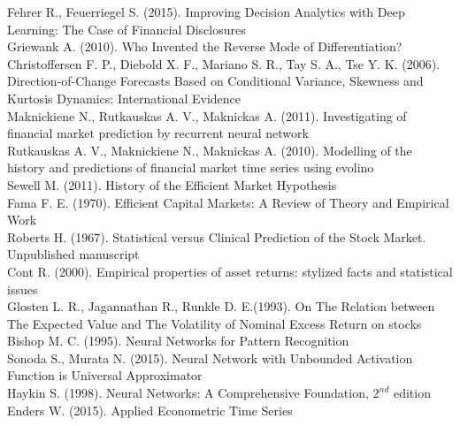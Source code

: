 \documentclass[12pt, letterpaper]{amsart}%
\begin{document}
Fehrer R., Feuerriegel S. (2015). Improving Decision Analytics with Deep Learning: The
Case of Financial Disclosures
\\

Griewank A. (2010). Who Invented the Reverse Mode of Differentiation?
\\

Christoffersen F. P., Diebold X. F., Mariano S. R., Tay S. A., Tse Y. K. (2006). Direction-of-Change Forecasts Based on Conditional Variance, Skewness and Kurtosis Dynamics: International Evidence
\\

Maknickiene N., Rutkauskas A. V., Maknickas A. (2011). Investigating of financial market prediction by recurrent neural network
\\

Rutkauskas A. V., Maknickiene N., Maknickas A. (2010). Modelling of the history and predictions of financial market time series using evolino
\\

Sewell M. (2011). History of the Efficient Market Hypothesis
\\

Fama F. E. (1970). Efficient Capital Markets: A Review of Theory and Empirical Work
\\

Roberts H. (1967). Statistical versus Clinical Prediction of the Stock Market. Unpublished manuscript
\\


Cont R. (2000). Empirical properties of asset returns: stylized facts and statistical issues
\\

Glosten L. R., Jagannathan R., Runkle D. E.(1993). On The Relation between The Expected Value and The Volatility of Nominal Excess Return on stocks
\\



Bishop M. C. (1995). Neural Networks for Pattern Recognition
\\

Sonoda S., Murata N. (2015). Neural Network with Unbounded Activation Function is Universal Approximator
\\

Haykin S. (1998). Neural Networks: A Comprehensive Foundation, $2^{nd}$ edition
\\

Enders W. (2015). Applied Econometric Time Series
\end{document}

